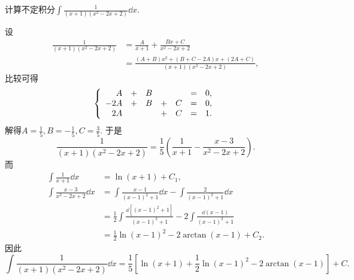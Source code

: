 \begin{example}
计算不定积分\(\int \frac1{(x+1)(x^2-2x+2)} \dd{x}\).
\begin{solution}
设\begin{align*}
	\frac1{(x+1)(x^2-2x+2)}
	&= \frac{A}{x+1} + \frac{Bx+C}{x^2-2x+2} \\
	&= \frac{(A+B)x^2+(B+C-2A)x+(2A+C)}{(x+1)(x^2-2x+2)},
\end{align*}
比较可得\begin{equation*}
	\left\{ \begin{array}{*7r}
		A &+& B && &=& 0, \\
		-2A &+& B &+& C &=& 0, \\
		2A && &+& C &=& 1.
	\end{array} \right.
\end{equation*}
解得\(A=\frac15,
B=-\frac15,
C=\frac35\).
于是\begin{equation*}
	\frac1{(x+1)(x^2-2x+2)}
	= \frac15 \left( \frac1{x+1} - \frac{x-3}{x^2-2x+2} \right).
\end{equation*}
而\begin{align*}
	\int \frac1{x+1} \dd{x}
	&= \ln(x+1) + C_1, \\
	\int \frac{x-3}{x^2-2x+2} \dd{x}
	&= \int \frac{x-1}{(x-1)^2+1} \dd{x}
	- \int \frac{2}{(x-1)^2+1} \dd{x} \\
	&= \frac12 \int \frac{\dd{[(x-1)^2+1]}}{(x-1)^2+1}
	- 2 \int \frac{\dd{(x-1)}}{(x-1)^2+1} \\
	&= \frac12 \ln(x-1)^2
	- 2 \arctan(x-1) + C_2.
\end{align*}
因此\begin{equation*}
	\int \frac1{(x+1)(x^2-2x+2)} \dd{x}
	= \frac15 \left[
		\ln(x+1) + \frac12 \ln(x-1)^2 - 2 \arctan(x-1)
	\right] + C.
\end{equation*}
\end{solution}
\end{example}
